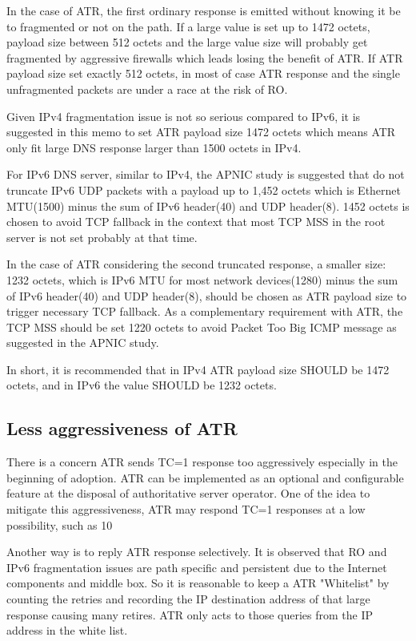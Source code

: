    In the case of ATR, the first ordinary response is emitted without
   knowing it be to fragmented or not on the path.  If a large value is
   set up to 1472 octets, payload size between 512 octets and the large
   value size will probably get fragmented by aggressive firewalls which
   leads losing the benefit of ATR.  If ATR payload size set exactly 512
   octets, in most of case ATR response and the single unfragmented
   packets are under a race at the risk of RO.

   Given IPv4 fragmentation issue is not so serious compared to IPv6, it
   is suggested in this memo to set ATR payload size 1472 octets which
   means ATR only fit large DNS response larger than 1500 octets in
   IPv4.

   For IPv6 DNS server, similar to IPv4, the APNIC study is suggested
   that do not truncate IPv6 UDP packets with a payload up to 1,452
   octets which is Ethernet MTU(1500) minus the sum of IPv6 header(40)
   and UDP header(8). 1452 octets is chosen to avoid TCP fallback in the
   context that most TCP MSS in the root server is not set probably at
   that time.

   In the case of ATR considering the second truncated response, a
   smaller size: 1232 octets, which is IPv6 MTU for most network
   devices(1280) minus the sum of IPv6 header(40) and UDP header(8),
   should be chosen as ATR payload size to trigger necessary TCP
   fallback.  As a complementary requirement with ATR, the TCP MSS
   should be set 1220 octets to avoid Packet Too Big ICMP message as
   suggested in the APNIC study.

   In short, it is recommended that in IPv4 ATR payload size SHOULD be
   1472 octets, and in IPv6 the value SHOULD be 1232 octets.

   \subsection{Less aggressiveness of ATR}

   There is a concern ATR sends TC=1 response too aggressively
   especially in the beginning of adoption.  ATR can be implemented as
   an optional and configurable feature at the disposal of authoritative
   server operator.  One of the idea to mitigate this aggressiveness,
   ATR may respond TC=1 responses at a low possibility, such as 10%

   Another way is to reply ATR response selectively.  It is observed
   that RO and IPv6 fragmentation issues are path specific and
   persistent due to the Internet components and middle box.  So it is
   reasonable to keep a ATR "Whitelist" by counting the retries and
   recording the IP destination address of that large response causing
   many retires.  ATR only acts to those queries from the IP address in
   the white list.
 
